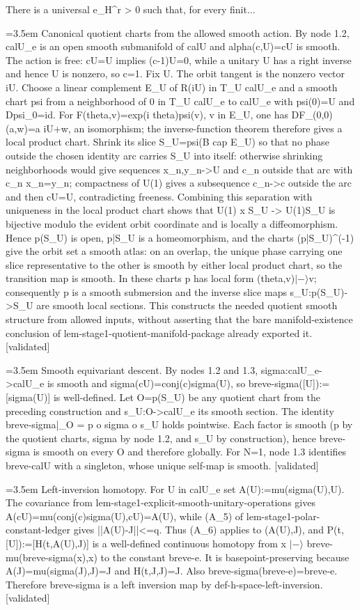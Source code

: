 \documentclass{article}
\newcommand{\step}[1]{\par\noindent\hangindent=3.5em\hangafter=1%
  \makebox[3.5em][l]{\textbf{#1.}}}
\newcommand{\steptag}[1]{\hfill{\small\textsf{[#1]}}}
\begin{document}
\begin{proofbox}{There is a universal e\_H\textasciicircum{}r > 0 such that, for every finit...}
\step{1.6.1} Canonical quotient charts from the allowed smooth action. By node 1.2, calU\_e is an open smooth submanifold of calU and alpha(c,U)=cU is smooth. The action is free: cU=U implies (c-1)U=0, while a unitary U has a right inverse and hence U is nonzero, so c=1. Fix U. The orbit tangent is the nonzero vector iU. Choose a linear complement E\_U of R(iU) in T\_U calU\_e and a smooth chart psi from a neighborhood of 0 in T\_U calU\_e to calU\_e with psi(0)=U and Dpsi\_0=id. For F(theta,v)=exp(i theta)psi(v), v in E\_U, one has DF\_(0,0)(a,w)=a iU+w, an isomorphism; the inverse-function theorem therefore gives a local product chart. Shrink its slice S\_U=psi(B cap E\_U) so that no phase outside the chosen identity arc carries S\_U into itself: otherwise shrinking neighborhoods would give sequences x\_n,y\_n->U and c\_n outside that arc with c\_n x\_n=y\_n; compactness of U(1) gives a subsequence c\_n->c outside the arc and then cU=U, contradicting freeness. Combining this separation with uniqueness in the local product chart shows that U(1) x S\_U -> U(1)S\_U is bijective modulo the evident orbit coordinate and is locally a diffeomorphism. Hence p(S\_U) is open, p|S\_U is a homeomorphism, and the charts (p|S\_U)\textasciicircum{}(-1) give the orbit set a smooth atlas: on an overlap, the unique phase carrying one slice representative to the other is smooth by either local product chart, so the transition map is smooth. In these charts p has local form (theta,v)$|-\rangle$v; consequently p is a smooth submersion and the inverse slice maps s\_U:p(S\_U)->S\_U are smooth local sections. This constructs the needed quotient smooth structure from allowed inputs, without asserting that the bare manifold-existence conclusion of lem-stage1-quotient-manifold-package already exported it. \steptag{validated} \\[4pt]
\step{1.6.2} Smooth equivariant descent. By nodes 1.2 and 1.3, sigma:calU\_e->calU\_e is smooth and sigma(cU)=conj(c)sigma(U), so breve-sigma([U]):=[sigma(U)] is well-defined. Let O=p(S\_U) be any quotient chart from the preceding construction and s\_U:O->calU\_e its smooth section. The identity breve-sigma|\_O = p o sigma o s\_U holds pointwise. Each factor is smooth (p by the quotient charts, sigma by node 1.2, and s\_U by construction), hence breve-sigma is smooth on every O and therefore globally. For N=1, node 1.3 identifies breve-calU with a singleton, whose unique self-map is smooth. \steptag{validated} \\[4pt]
\step{1.7} Left-inversion homotopy. For U in calU\_e set A(U):=mu(sigma(U),U). The covariance from lem-stage1-explicit-smooth-unitary-operations gives A(cU)=mu(conj(c)sigma(U),cU)=A(U), while (A\_5) of lem-stage1-polar-constant-ledger gives ||A(U)-J||<=q. Thus (A\_6) applies to (A(U),J), and P(t,[U]):=[H(t,A(U),J)] is a well-defined continuous homotopy from x $|-\rangle$ breve-mu(breve-sigma(x),x) to the constant breve-e. It is basepoint-preserving because A(J)=mu(sigma(J),J)=J and H(t,J,J)=J. Also breve-sigma(breve-e)=breve-e. Therefore breve-sigma is a left inversion map by def-h-space-left-inversion. \steptag{validated} \\[4pt]
\end{proofbox}
\end{document}
